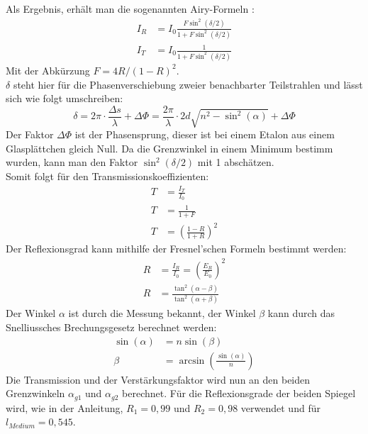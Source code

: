 Als Ergebnis, erhält man die sogenannten Airy-Formeln \citep[vgl.][S.86-88]{Laser-Dem}:
\begin{align}
    I_R&=I_0\frac{F\sin^2\left(\delta/2\right)}{1+F\sin^2\left(\delta/2\right)}\\
    I_T&=I_0\frac{1}{1+F\sin^2\left(\delta/2\right)}
\end{align}
Mit der Abkürzung $F=4R/(1-R)^2$.\\
$\delta$ steht hier für die Phasenverschiebung zweier benachbarter Teilstrahlen und lässt sich wie folgt umschreiben:
\begin{equation}
    \delta=2\pi\cdot\frac{\Delta s}{\lambda}+\Delta\Phi = \frac{2\pi}{\lambda}\cdot2d\sqrt{n^2-\sin^2\left(\alpha\right)}+\Delta\Phi
\end{equation}
Der Faktor $\Delta\Phi$ ist der Phasensprung, dieser ist bei einem Etalon aus einem Glasplättchen gleich Null.
Da die Grenzwinkel in einem Minimum bestimm wurden, kann man den Faktor $\sin^2\left(\delta/2\right)$ mit 1 abschätzen.\\
Somit folgt für den Transmissionskoeffizienten:
\begin{align}
    T&=\frac{I_T}{I_0}\\
    T&=\frac{1}{1+F}\\
    T&=\left(\frac{1-R}{1+R}\right)^2
\end{align}
Der Reflexionsgrad kann mithilfe der Fresnel'schen Formeln bestimmt werden:
\begin{align}
    R&=\frac{I_R}{I_0}=\left(\frac{E_R}{E_0}\right)^2\\
    R&=\frac{\tan^2\left(\alpha-\beta\right)}{\tan^2\left(\alpha+\beta\right)}
\end{align}
Der Winkel $\alpha$ ist durch die Messung bekannt, der Winkel $\beta$ kann durch das Snelliussches Brechungsgesetz berechnet werden:
\begin{align}
    \sin(\alpha)&=n\sin\left(\beta\right)\\
    \beta&=\arcsin\left(\frac{\sin\left(\alpha\right)}{n}\right)%
\end{align}
Die Transmission und der Verstärkungsfaktor wird nun an den beiden Grenzwinkeln $\alpha_{g1}$ und $\alpha_{g2}$ berechnet.
Für die Reflexionsgrade der beiden Spiegel wird, wie in der Anleitung, $R_1 = 0,99$ und $R_2 = 0,98$ verwendet und für $l_{Medium} = 0,545$.
